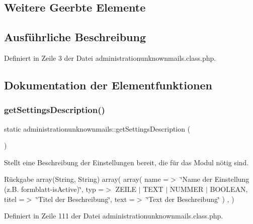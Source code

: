 \subsection*{Weitere Geerbte Elemente}


\subsection{Ausführliche Beschreibung}


Definiert in Zeile 3 der Datei administrationunknownmails.\+class.\+php.



\subsection{Dokumentation der Elementfunktionen}
\mbox{\label{classadministrationunknownmails_a087a865a9417109b1aacdd7dd36ec021}} 
\subsubsection{\texorpdfstring{get\+Settings\+Description()}{getSettingsDescription()}}
{\footnotesize\ttfamily static administrationunknownmails\+::get\+Settings\+Description (\begin{DoxyParamCaption}{ }\end{DoxyParamCaption})\hspace{0.3cm}{\ttfamily [static]}}

Stellt eine Beschreibung der Einstellungen bereit, die für das Modul nötig sind. \begin{DoxyReturn}{Rückgabe}
array(\+String, String) array( array( \textquotesingle{}name\textquotesingle{} =$>$ \char`\"{}\+Name der Einstellung (z.\+B. formblatt-\/is\+Active)\char`\"{}, \textquotesingle{}typ\textquotesingle{} =$>$ Z\+E\+I\+LE $\vert$ T\+E\+XT $\vert$ N\+U\+M\+M\+ER $\vert$ B\+O\+O\+L\+E\+AN, \textquotesingle{}titel\textquotesingle{} =$>$ \char`\"{}\+Titel der Beschreibung\char`\"{}, \textquotesingle{}text\textquotesingle{} =$>$ \char`\"{}\+Text der Beschreibung\char`\"{} ) , ) 
\end{DoxyReturn}


Definiert in Zeile 111 der Datei administrationunknownmails.\+class.\+php.


